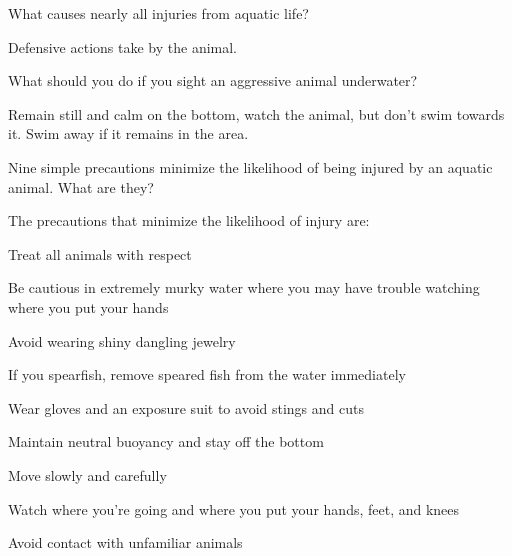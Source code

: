 	\begin{qanda}
		\begin{question}
What causes nearly all injuries from aquatic life?
		\end{question}

		\begin{answer}
Defensive actions take by the animal.
		\end{answer}
	\end{qanda}

	\begin{qanda}
		\begin{question}
What should you do if you sight an aggressive animal underwater?
		\end{question}

		\begin{answer}
Remain still and calm on the bottom, watch the animal, but don't swim towards it.  Swim away if it remains in the area.
		\end{answer}
	\end{qanda}

	\begin{qanda}
		\begin{question}
Nine simple precautions minimize the likelihood of being injured by an aquatic animal.  What are they?
		\end{question}

		\begin{answer}
The precautions that minimize the likelihood of injury are:
			\begin{nospacenumberedlist}
				\item Treat all animals with respect
				\item Be cautious in extremely murky water where you may have trouble watching where you put your hands
				\item Avoid wearing shiny dangling jewelry
				\item If you spearfish, remove speared fish from the water immediately
				\item Wear gloves and an exposure suit to avoid stings and cuts
				\item Maintain neutral buoyancy and stay off the bottom
				\item Move slowly and carefully
				\item Watch where you're going and where you put your hands, feet, and knees
				\item Avoid contact with unfamiliar animals
			\end{nospacenumberedlist}
		\end{answer}
	\end{qanda}

